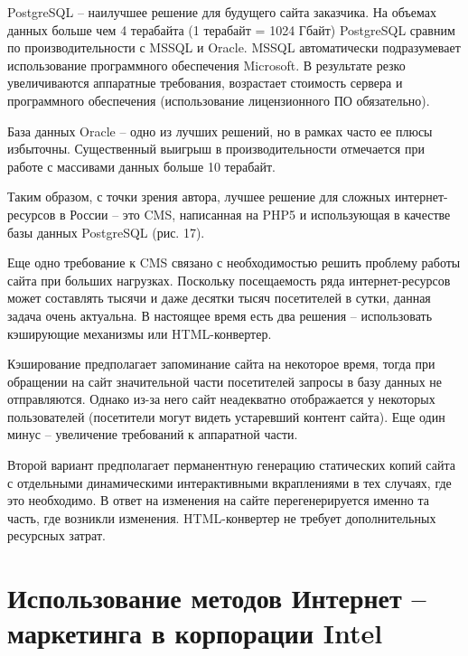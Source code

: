 \documentclass[a4paper,english,russian]{G2-105}
\begin{document}
\par PostgreSQL – наилучшее решение для будущего сайта заказчика. На объемах данных больше чем 4 терабайта (1 терабайт = 1024 Гбайт) PostgreSQL сравним по производительности с MSSQL  и Oracle. 
MSSQL  автоматически подразумевает использование программного обеспечения Microsoft.  В результате резко увеличиваются аппаратные требования, возрастает стоимость сервера и программного обеспечения (использование лицензионного ПО обязательно).
\par База данных Oracle  – одно из лучших решений, но в рамках часто ее плюсы избыточны. Существенный выигрыш в производительности отмечается при работе с массивами данных больше 10 терабайт.
\par Таким образом, с точки зрения автора, лучшее решение для сложных интернет-ресурсов в России – это CMS, написанная на PHP5 и использующая в качестве базы данных PostgreSQL (рис. 17).
\par Еще одно требование к CMS  связано с необходимостью решить проблему работы сайта при больших нагрузках. Поскольку посещаемость ряда интернет-ресурсов может составлять тысячи и даже десятки тысяч посетителей в сутки, данная задача очень актуальна. В настоящее время есть два решения – использовать кэширующие механизмы или HTML-конвертер.
\par Кэширование предполагает запоминание сайта на некоторое время, тогда при обращении на сайт значительной части посетителей запросы в базу данных не отправляются. Однако из-за него сайт неадекватно отображается у некоторых пользователей (посетители могут видеть устаревший контент сайта). Еще один минус – увеличение требований к аппаратной части.
\par Второй вариант предполагает перманентную генерацию статических копий сайта с отдельными динамическими интерактивными вкраплениями в тех случаях, где это необходимо. В ответ на изменения на сайте перегенерируется именно та часть, где возникли изменения. HTML-конвертер не требует дополнительных ресурсных затрат.
\newpage

\chapter{Использование методов Интернет – маркетинга в корпорации Intel}
\end{document}
